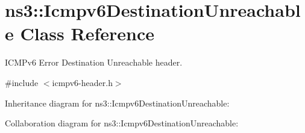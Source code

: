 \hypertarget{classns3_1_1Icmpv6DestinationUnreachable}{}\section{ns3\+:\+:Icmpv6\+Destination\+Unreachable Class Reference}
\label{classns3_1_1Icmpv6DestinationUnreachable}


I\+C\+M\+Pv6 Error Destination Unreachable header.  




{\ttfamily \#include $<$icmpv6-\/header.\+h$>$}



Inheritance diagram for ns3\+:\+:Icmpv6\+Destination\+Unreachable\+:


Collaboration diagram for ns3\+:\+:Icmpv6\+Destination\+Unreachable\+:
